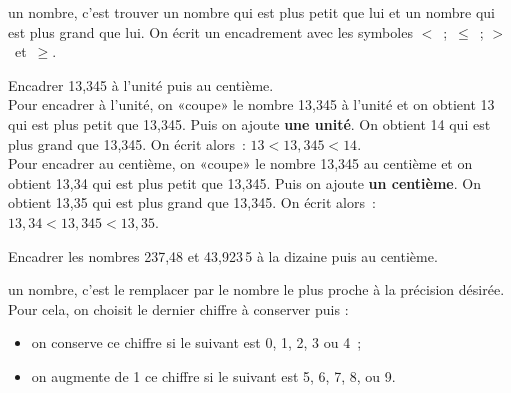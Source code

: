 \begin{methode*1}[Encadrer]

\begin{aconnaitre}
\textbf{} un nombre, c'est trouver un nombre qui est plus petit que lui et un nombre qui est plus grand que lui. On écrit un encadrement avec les symboles $<$ ; $\leqslant$ ; $>$ et $\geqslant$. 
\end{aconnaitre}

\begin{exemple*1}
Encadrer 13,345 à l'unité puis au centième.\\[0.5em]
Pour encadrer à l'unité, on «coupe» le nombre 13,345 à l'unité et on obtient 13 qui est plus petit  que 13,345. Puis on ajoute \textbf{une unité}. On obtient 14 qui est plus grand que 13,345. On écrit alors : $13 < 13,345 < 14$. \\[1em]
Pour encadrer au centième, on «coupe» le nombre 13,345 au centième et on obtient 13,34 qui est plus petit que 13,345. Puis on ajoute \textbf{un centième}. On obtient 13,35 qui est plus grand que 13,345. On écrit alors : $13,34 < 13,345 < 13,35$.
\end{exemple*1}

\exercice

Encadrer les nombres 237,48 et 43,923\,5 à la dizaine puis au centième.

\end{methode*1}


\begin{methode*1}[Arrondir]

\begin{aconnaitre}
\textbf{} un nombre, c’est le remplacer par le nombre le plus proche à la précision désirée. Pour cela, on choisit le dernier chiffre à conserver puis :
\begin{itemize}
 \item on conserve ce chiffre si le suivant est 0, 1, 2, 3 ou 4 ;
 \item on augmente de 1 ce chiffre si le suivant est 5, 6, 7, 8, ou 9.
 \end{itemize}
\end{aconnaitre}

\exercice


\end{methode*1}

